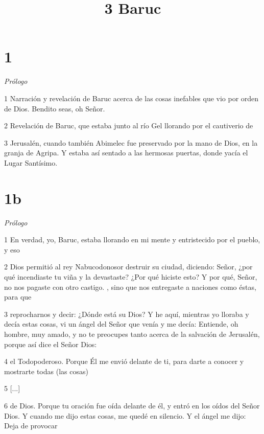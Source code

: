 

\title{3 Baruc}

\chapter{1}

\par \textit{Prólogo}

\par 1 Narración y revelación de Baruc acerca de las cosas inefables que vio por orden de Dios. Bendito seas, oh Señor.

\par 2 Revelación de Baruc, que estaba junto al río Gel llorando por el cautiverio de

\par 3 Jerusalén, cuando también Abimelec fue preservado por la mano de Dios, en la granja de Agripa. Y estaba así sentado a las hermosas puertas, donde yacía el Lugar Santísimo.

\chapter{1b}

\par \textit{Prólogo}

\par 1 En verdad, yo, Baruc, estaba llorando en mi mente y entristecido por el pueblo, y eso

\par 2 Dios permitió al rey Nabucodonosor destruir su ciudad, diciendo: Señor, ¿por qué incendiaste tu viña y la devastaste? ¿Por qué hiciste esto? Y por qué, Señor, no nos pagaste con otro castigo. , sino que nos entregaste a naciones como éstas, para que

\par 3 reprocharnos y decir: ¿Dónde está su Dios? Y he aquí, mientras yo lloraba y decía estas cosas, vi un ángel del Señor que venía y me decía: Entiende, oh hombre, muy amado, y no te preocupes tanto acerca de la salvación de Jerusalén, porque así dice el Señor Dios:

\par 4 el Todopoderoso. Porque Él me envió delante de ti, para darte a conocer y mostrarte todas (las cosas)

\par 5 [...]

\par 6 de Dios. Porque tu oración fue oída delante de él, y entró en los oídos del Señor Dios. Y cuando me dijo estas cosas, me quedé en silencio. Y el ángel me dijo: Deja de provocar

